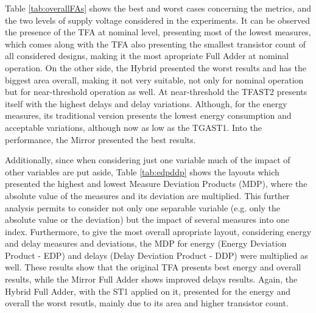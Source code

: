 \documentclass[pgmicro,diss,english]{iiufrgs}
\begin{document}
Table \ref{tab:overallFAs} shows the best and worst cases concerning the metrics, and the two levels of supply voltage considered in the experiments. It can be observed the presence of the TFA at nominal level, presenting most of the lowest measures, which comes along with the TFA also presenting the smallest transistor count of all considered designs, making it the most apropriate Full Adder at nominal operation. On the other side, the Hybrid presented the worst results and has the biggest area overall, making it not very suitable, not only for nominal operation but for near-threshold operation as well. At near-threshold the TFAST2 presents itself with the highest delays and delay variations. Although, for the energy measures, its traditional version presents the lowest energy consumption and acceptable variations, although now as low as the TGAST1. Into the performance, the Mirror presented the best results.

\begin{table}[]
\centering
\caption{Best and worst cases considering all metrics and the two types of operation considered in the experiments.}
\label{tab:overallFAs}
\end{table}

Additionally, since when considering just one variable much of the impact of other variables are put aside, Table \ref{tab:edpddp} shows the layouts which presented the highest and lowest Measure Deviation Products (MDP), where the absolute value of the measures and its deviation are multiplied. This further analysis permits to consider not only one separable variable (e.g. only the absolute value or the deviation) but the impact of several measures into one index. Furthermore, to give the most overall apropriate layout, considering energy and delay measures and deviations, the MDP for energy (Energy Deviation Product - EDP) and delays (Delay Deviation Product - DDP) were multiplied as well. These results show that the original TFA presents best energy and overall results, while the Mirror Full Adder shows improved delays results. Again, the Hybrid Full Adder, with the ST1 applied on it, presented for the energy and overall the worst resutls, mainly due to its area and higher transistor count.
\end{document}
